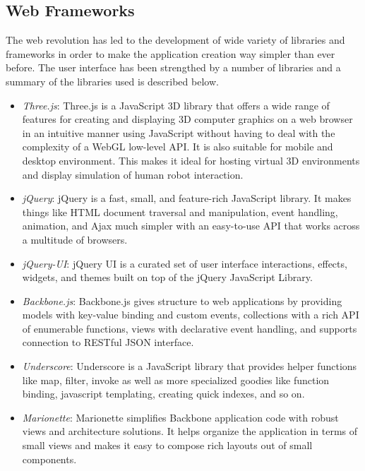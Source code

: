 \subsection{Web Frameworks}
The web revolution has led to the development of wide variety of libraries and frameworks in order to make the application creation way simpler than ever before. The user interface has been strengthed by a number of libraries and a summary of the libraries used is described below.
\begin{itemize}
\item \emph{Three.js}: Three.js is a JavaScript 3D library that offers a wide range of features for creating and displaying 3D computer graphics on a web browser in an intuitive manner using JavaScript without having to deal with the complexity of a WebGL low-level API. It is also suitable for mobile and desktop environment. This makes it ideal for hosting virtual 3D environments and display simulation of human robot interaction.
\item \emph{jQuery}: jQuery is a fast, small, and feature-rich JavaScript library. It makes things like HTML document traversal and manipulation, event handling, animation, and Ajax much simpler with an easy-to-use API that works across a multitude of browsers. 
\item \emph{jQuery-UI}: jQuery UI is a curated set of user interface interactions, effects, widgets, and themes built on top of the jQuery JavaScript Library. 
\item \emph{Backbone.js}: Backbone.js gives structure to web applications by providing models with key-value binding and custom events, collections with a rich API of enumerable functions, views with declarative event handling, and supports connection to RESTful JSON interface.
\item \emph{Underscore}: Underscore is a JavaScript library that provides helper functions like map, filter, invoke as well as more specialized goodies like function binding, javascript templating, creating quick indexes, and so on.
\item \emph{Marionette}: Marionette simplifies Backbone application code with robust views and architecture solutions. It helps organize the application in terms of small views and makes it easy to compose rich layouts out of small components.
\end{itemize}
